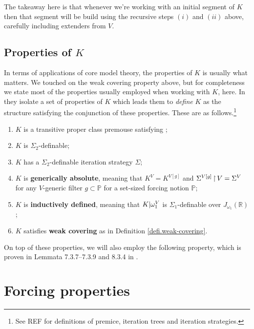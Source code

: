 \documentclass[../../main]{subfiles}
\begin{document}
\qquad The takeaway here is that whenever we're working with an initial segment of $K$ then that segment will be build using the recursive steps $(i)$ and $(ii)$ above, carefully including extenders from $V$.

\subsection{Properties of $K$}

In terms of applications of core model theory, the properties of $K$ is usually what matters. We touched on the weak covering property above, but for completeness we state most of the properties usually employed when working with $K$, here. In \cite{Kwithoutmeasurable} they isolate a set of properties of $K$ which leads them to \textit{define} $K$ as the structure satisfying the conjunction of these properties. These are as follows.\footnote{See REF for definitions of premice, iteration trees and iteration strategies.}

\begin{enumerate}
  \item $K$ is a transitive proper class premouse satisfying \zfc;
  \item $K$ is $\Sigma_2$-definable;
  \item $K$ has a $\Sigma_2$-definable iteration strategy $\Sigma$;
  \item $K$ is \textbf{generically absolute}, meaning that $K^V=K^{V[g]}$ and $\Sigma^{V[g]}\operatorname{\upharpoonright} V=\Sigma^V$ for any $V$-generic filter $g\subset\mathbb P$ for a set-sized forcing notion $\mathbb P$;
  \item $K$ is \textbf{inductively defined}, meaning that $K|\omega_1^V$ is $\Sigma_1$-definable over $J_{\omega_1}(\mathbb R)$;
  \item $K$ satisfies \textbf{weak covering} as in Definition \ref{defi.weak-covering}.\\
\end{enumerate}

On top of these properties, we will also employ the following property, which is proven in Lemmata 7.3.7--7.3.9 and 8.3.4 in \cite{Zeman}.



\section{Forcing properties}
\label{prelims.forcing}
\end{document}

